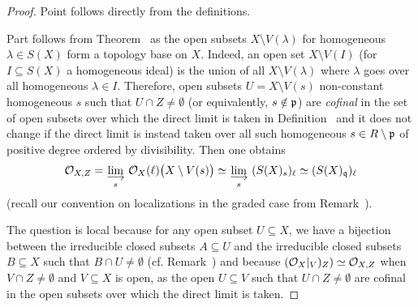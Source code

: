 \documentclass[a4paper,parskip=half,numbers=enddot, DIV=12]{scrreprt}
\begin{document}
\begin{proof}
Point  follows directly from the definitions.

Part  follows from Theorem~ as the open subsets $X\setminus V(\lambda)$ for homogeneous $\lambda\in S(X)$ form a topology base on $X$. Indeed, an open set $X\setminus V(I)$ (for $I\subseteq S(X)$ a homogeneous ideal) is the union of all $X\setminus V(\lambda)$ where $\lambda$ goes over all homogeneous $\lambda\in I$. Therefore, open subsets $U= X\setminus V(s)$ non-constant homogeneous $s$ such that $U\cap Z \neq \emptyset$ (or equivalently, $s\notin\mathfrak{p}$) are \emph{cofinal} in the set of open subsets over which the direct limit is taken in Definition~ and it does not change if the direct limit is instead taken over all such homogeneous $s\in R\setminus\mathfrak{p}$ of positive degree ordered by divisibility. Then one obtains 
\begin{align*}
	\Oo_{X,Z}=\colimit[s]\Oo_X(\ell)\big(X\setminus V(s)\big)\simeq\colimit[s] (S(X)_s)_\ell \simeq (S(X)_\qq)_\ell
\end{align*}
(recall our convention on localizations in the graded case from Remark~).

The question  is local because for any open subset $U\subseteq X$, we have a bijection between the irreducible closed subsets $A\subseteq U$ and the irreducible closed subsets $B\subseteq X$ such that $B\cap U\neq\emptyset$ (cf. Remark~) and because $(\mathcal{O}_X|_V)_Z) \simeq \mathcal{O}_{X,Z}$ when $V\cap Z\neq \emptyset$ and $V\subseteq X$ is open, as the open $U\subseteq V$ such that $U\cap Z\neq\emptyset$ are cofinal in the open subsets over which the direct limit is taken.


\end{proof}
\end{document}
